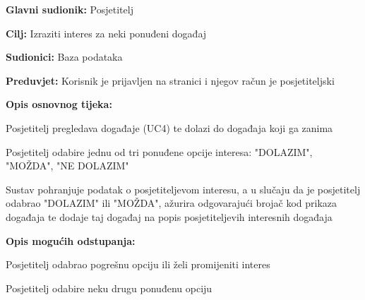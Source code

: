 					\noindent {}
\begin{packed_item}
	\item \textbf{Glavni sudionik:} Posjetitelj
	\item  \textbf{Cilj:} Izraziti interes za neki ponuđeni događaj
	\item  \textbf{Sudionici:} Baza podataka
	\item  \textbf{Preduvjet:} Korisnik je prijavljen na stranici i njegov račun je posjetiteljski
	\item  \textbf{Opis osnovnog tijeka:} 
	
	\item[] \begin{packed_enum}
		
		\item Posjetitelj pregledava događaje (UC4) te dolazi do događaja koji ga zanima
		\item Posjetitelj odabire jednu od tri ponuđene opcije interesa: "DOLAZIM", "MOŽDA", "NE DOLAZIM"
		\item Sustav pohranjuje podatak o posjetiteljevom interesu, a u slučaju da je posjetitelj odabrao "DOLAZIM" ili "MOŽDA", ažurira odgovarajući brojač kod prikaza događaja te dodaje taj događaj na popis posjetiteljevih interesnih događaja
	\end{packed_enum}
	
		\item  \textbf{Opis mogućih odstupanja:}
	
	\item[] \begin{packed_item}
		
		\item[2.a] Posjetitelj odabrao pogrešnu opciju ili želi promijeniti interes
		\item[] \begin{packed_enum}
			
			\item Posjetitelj odabire neku drugu ponuđenu opciju
			
		\end{packed_enum}
		
	\end{packed_item}

\end{packed_item}



